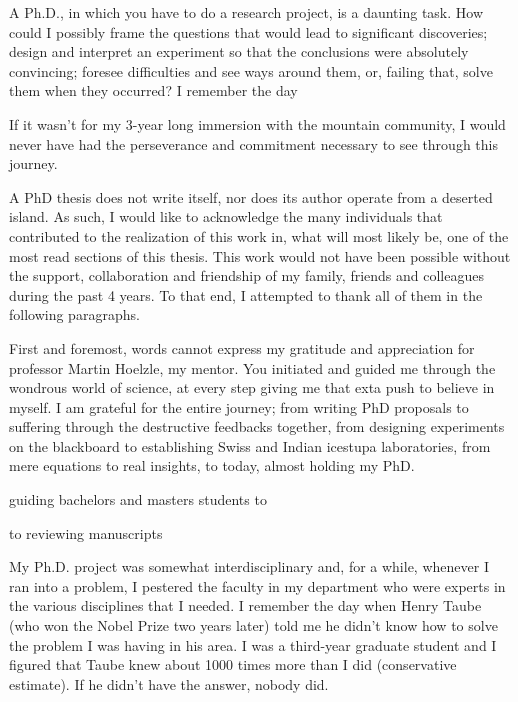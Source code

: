 %
\label{sec:acknowledgement}

A Ph.D., in which you have to do a research project, is a daunting task. How could I possibly frame the
questions that would lead to significant discoveries; design and interpret an experiment so that the conclusions
were absolutely convincing; foresee difficulties and see ways around them, or, failing that, solve them when
they occurred? I remember the day 

If it wasn't for my 3-year long immersion with the mountain community, I would never have had the
perseverance and commitment necessary to see through this journey.

A PhD thesis does not write itself, nor does its author operate from a deserted island. As such, I would like to
acknowledge the many individuals that contributed to the realization of this work in, what will most likely be,
one of the most read sections of this thesis. This work would not have been possible without the support,
collaboration and friendship of my family, friends and colleagues during the past 4 years. To that end, I
attempted to thank all of them in the following paragraphs.

First and foremost, words cannot express my gratitude and appreciation for professor Martin Hoelzle, my mentor.
You initiated and guided me through the wondrous world of science, at every step giving me that exta push to
believe in myself. I am grateful for the entire journey; from writing PhD proposals to suffering through the
destructive feedbacks together, from designing experiments on the blackboard to establishing Swiss and Indian
icestupa laboratories, from mere equations to real insights, to today, almost holding my PhD. 

guiding bachelors and masters students to 

to reviewing manuscripts 


My Ph.D. project was somewhat interdisciplinary and, for a while, whenever I ran into a problem,
I pestered the faculty in my department who were experts in the various disciplines that I needed. I remember
the day when Henry Taube (who won the Nobel Prize two years later) told me he didn't know how to solve the
problem I was having in his area. I was a third-year graduate student and I figured that Taube knew about 1000
times more than I did (conservative estimate). If he didn't have the answer, nobody did.

